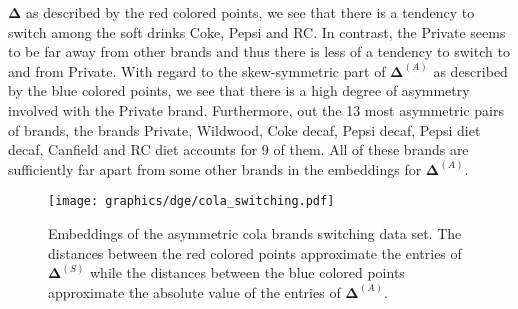 $\bm{\Delta}$ as described by the red colored points, we see that
there is a tendency to switch among the soft drinks Coke, Pepsi and
RC. In contrast, the Private seems to be far away from other brands
and thus there is less of a tendency to switch to and from
Private. With regard to the skew-symmetric part of $\bm{\Delta}^{(A)}$
as described by the blue colored points, we see that there is a high
degree of asymmetry involved with the Private brand. Furthermore, out
the 13 most asymmetric pairs of brands, the brands Private, Wildwood,
Coke decaf, Pepsi decaf, Pepsi diet decaf, Canfield and RC diet
accounts for 9 of them. All of these brands are sufficiently far apart
from some other brands in the embeddings for $\bm{\Delta}^{(A)}$. 
\begin{figure}[htbp]
  \centering
    \texttt{[image: graphics/dge/cola\_switching.pdf]}
    \caption{Embeddings of the asymmetric cola brands switching
      data set. The distances between the red colored points
      approximate the entries of $\bm{\Delta}^{(S)}$ while the
      distances between the blue colored points approximate the
      absolute value of the entries of $\bm{\Delta}^{(A)}$.}
  \label{fig:colaswitch}
\end{figure}
